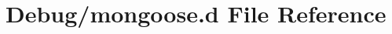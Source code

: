 \hypertarget{Debug_2mongoose_8d}{}\section{Debug/mongoose.d File Reference}
\label{Debug_2mongoose_8d}
